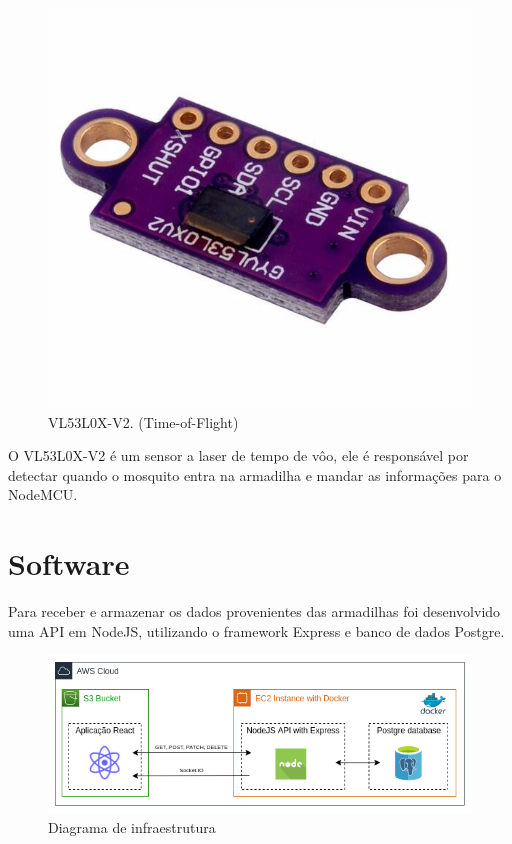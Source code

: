 \documentclass[
	12pt,				%
	openright,			%
	oneside,			%
	a4paper,			%
	chapter=TITLE,		%
	english,			%
	brazil				%
	]{abntex2}
\begin{document}
\begin{figure}[H]
\centering
\includegraphics[scale=0.1]{imagens/gy-vl53l0x.jpg}
\caption{VL53L0X-V2. (Time-of-Flight)}
    \label{fig:gy-vl53l0x}
\end{figure}

O VL53L0X-V2 é um sensor a laser de tempo de vôo, ele é responsável por detectar quando o mosquito entra na armadilha e mandar as 
informações para o NodeMCU.

\section{Software}

Para receber e armazenar os dados provenientes das armadilhas foi desenvolvido uma API em NodeJS, utilizando o framework Express
e banco de dados Postgre.

\begin{figure}[H]
\centering
\includegraphics[scale=0.6]{imagens/diagramacloud.png}
\caption{Diagrama de infraestrutura}
    \label{fig:cloud}
\end{figure}
\end{document}
